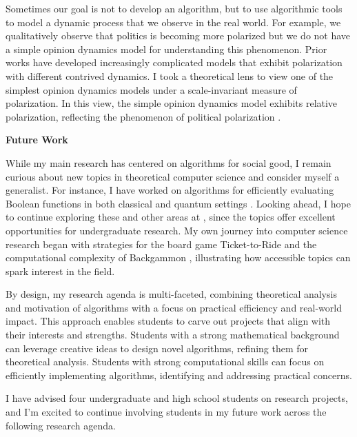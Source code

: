 \documentclass[11pt]{article}
\begin{document}
{Sometimes our goal is not to develop an algorithm, but to use algorithmic tools to model a dynamic process that we observe in the real world. For example, we qualitatively observe that politics is becoming more polarized but we do not have a simple opinion dynamics model for understanding this phenomenon. Prior works have developed increasingly complicated models that exhibit polarization with different contrived dynamics. I took a theoretical lens to view one of the simplest opinion dynamics models under a scale-invariant measure of polarization. In this view, the simple opinion dynamics model exhibits relative polarization, reflecting the phenomenon of political polarization \cite{musco2022quantify}.

\begin{center}
{\large \textbf{Future Work}}
\end{center}

While my main research has centered on algorithms for social good, I remain curious about new topics in theoretical computer science and consider myself a generalist. For instance, I have worked on algorithms for efficiently evaluating Boolean functions in both classical \cite{hellerstein2022adaptivity} and quantum settings \cite{czekanski2023robust,kimmel2021query,delorenzo2019applications}. Looking ahead, I hope to continue exploring these and other areas at \school, since the topics offer excellent opportunities for undergraduate research. My own journey into computer science research began with strategies for the board game Ticket-to-Ride \cite{witter2020applications} and the computational complexity of Backgammon \cite{witter2021backgammon}, illustrating how accessible topics can spark interest in the field.

By design, my research agenda is multi-faceted, combining theoretical analysis and motivation of algorithms with a focus on practical efficiency and real-world impact. This approach enables students to carve out projects that align with their interests and strengths. Students with a strong mathematical background can leverage creative ideas to design novel algorithms, refining them for theoretical analysis. Students with strong computational skills can focus on efficiently implementing algorithms, identifying and addressing practical concerns.

I have advised four undergraduate and high school students on research projects, and I'm excited to continue involving students in my future work across the following research agenda.

}
\end{document}
